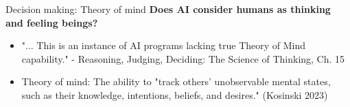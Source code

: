 \documentclass[8pt]{beamer}
\begin{document}
	\begin{frame}[t]{Decision making: Theory of mind}
		\textbf{Does AI consider humans as thinking and feeling beings?}
		\begin{itemize}
			\item <2-> "... This is an instance of AI programs lacking true Theory of Mind capability." - Reasoning, Judging, Deciding: The Science of Thinking, Ch. 15
			\item <2-> Theory of mind: The ability to "track others' unobservable mental states, such as their knowledge, intentions, beliefs, and desires." (Kosinski 2023)
		\end{itemize}

	\end{frame}
\end{document}
